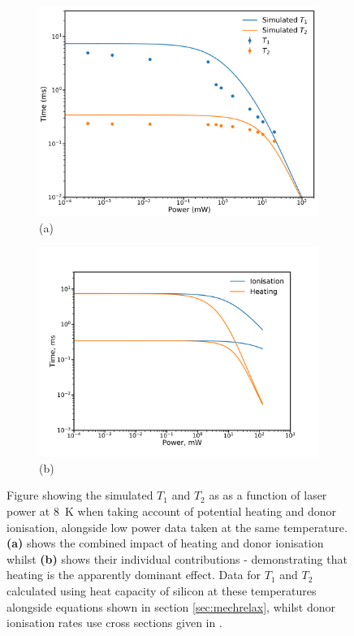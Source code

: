 \begin{figure}
\centering
\begin{subfigure}[b]{\textwidth}
\centering
\includegraphics[width = 0.8\columnwidth]{Figures/simt1t2.pdf}{(a)}
\end{subfigure}
\begin{subfigure}[b]{\textwidth}
\centering
\includegraphics[width = 0.8\columnwidth]{Figures/ionvsheat.pdf}{(b)}
\end{subfigure}
\caption[Simulated $T_1$ under heating]{Figure showing the simulated $T_1$ and $T_2$ as as a function of laser power at 8~K when taking account of potential heating and donor ionisation, alongside low power data taken at the same temperature. \textbf{(a)} shows the combined impact of heating and donor ionisation whilst \textbf{(b)} shows their individual contributions - demonstrating that heating is the apparently dominant effect. Data for $T_1$ and $T_2$ calculated using heat capacity of silicon at these temperatures alongside equations shown in section \ref{sec:mechrelax}, whilst donor ionisation rates use cross sections given in \cite{Sclar1984,Ross2017a}.}
\label{fig:t1t2sim}
\end{figure}

